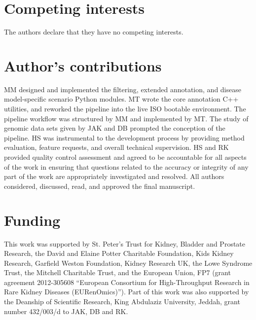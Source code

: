 \documentclass[twocolumn]{bmcart}%
\begin{document}
\begin{backmatter}
\section*{Competing interests}
The authors declare that they have no competing interests.

\section*{Author's contributions}
MM designed and implemented the filtering, extended annotation, and disease model-specific scenario Python modules. MT wrote the core annotation C++ utilities, and reworked the pipeline into the live ISO bootable environment. The pipeline workflow was structured by MM and implemented by MT. The study of genomic data sets given by JAK and DB prompted the conception of the pipeline. HS was instrumental to the development process by providing method evaluation, feature requests, and overall technical supervision. HS and RK provided quality control assessment and agreed to be accountable for all aspects of the work in ensuring that questions related to the accuracy or integrity of any part of the work are appropriately investigated and resolved. All authors considered, discussed, read, and approved the final manuscript.



\section*{Funding}
This work was supported by St. Peter's Trust for Kidney, Bladder and Prostate Research, the David and Elaine Potter Charitable Foundation, Kids Kidney Research, Garfield Weston Foundation, Kidney Research UK, the Lowe Syndrome Trust, the Mitchell Charitable Trust, and the European Union, FP7 (grant agreement 2012-305608 ``European Consortium for High-Throughput Research in Rare Kidney Diseases (EURenOmics)''). Part of this work was also supported by the Deanship of Scientific Research, King Abdulaziz University, Jeddah, grant number 432/003/d to JAK, DB and RK.




\end{backmatter}
\end{document}
